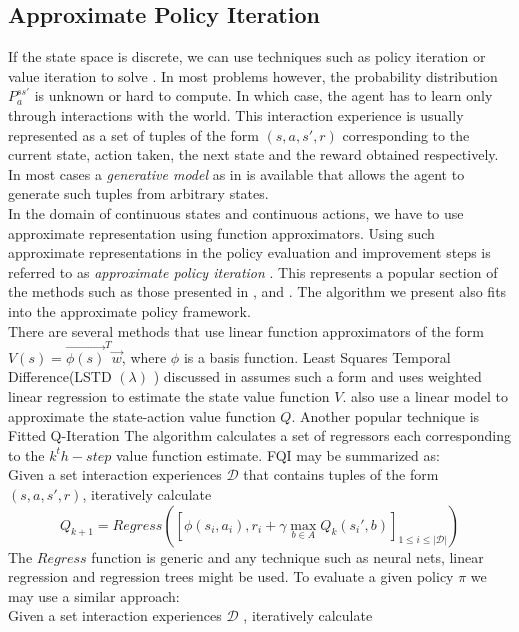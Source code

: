 \documentclass[wcp]{jmlr}
\begin{document}
\subsection*{Approximate Policy Iteration}
 If the state space is discrete, we can use techniques such as policy iteration or value iteration to solve . In most problems however, the probability distribution $P^{ss'}_a$ is unknown or hard to compute. In which case, the agent has to learn only through interactions with the world. This interaction experience is usually represented as a set of tuples of the form $(s,a,s',r)$ corresponding to the current state, action taken, the next state and the reward obtained respectively. In most cases a \textit{generative model} as in \citep{kearns99} is available that allows the agent to generate such tuples from arbitrary states. \\
In the domain of continuous states and continuous actions, we have to use approximate representation using function approximators. Using such approximate representations in the policy evaluation and improvement steps is referred to as \textit{approximate policy iteration} \citep{neurodp}. This represents a popular section of the methods such as those presented in \citep{lspi},\citep{rmaxlspi} and \citep{antosml}. The algorithm we present also fits into the approximate policy framework.\\
There are several methods that use  linear function approximators of the form $V(s) = \vec{\phi(s)}^T\vec{w} $, where $\phi$ is a basis function. Least Squares Temporal Difference(LSTD $ (\lambda ) $ ) discussed in \citep{lstd} assumes such a form and uses weighted linear regression to estimate the state value function $V$. \citep{antosml} also use a linear model to approximate the state-action value function $Q$. Another popular technique is Fitted Q-Iteration The algorithm calculates a set of regressors each corresponding to the $k^th-step$ value function estimate. FQI may be summarized as: \\Given a set interaction experiences $\mathcal{D}$  that contains tuples of the form $(s,a,s',r)$, iteratively calculate \[Q_{k+1} = Regress\left( \left[ \phi(s_i,a_i), r_i+\gamma \max_{b\in A}Q_k(s_i',b) \right]_{1 \leq i \leq \vert \mathcal{D}\vert } \right) \] 
The $Regress$ function is generic and any technique such as neural nets, linear regression and regression trees might be used. To evaluate a given policy $\pi$ we may use a similar approach:\\
Given a set interaction experiences $\mathcal{D}$ , iteratively calculate
\end{document}
